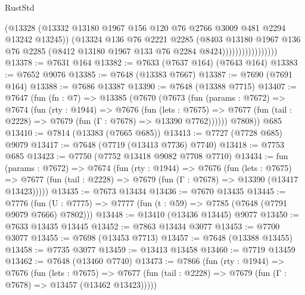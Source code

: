 \begin{lexlean}{RustStd}
\begin{coremodule}
{\begin{coremodule}
{{{{{{{{{{{{{{{{{{{{{{{{{{{{{{{{{{{{{{{{{{{{{{{{{{{{{                                (@13328
                                  (@13332
                                    @13180
                                    @1967
                                    @156
                                    @120
                                    @76
                                    @2766
                                    @3009
                                    @481
                                    @2294
                                    @13242
                                    @13245))
                                (@13324
                                  @136
                                  @76
                                  @2221
                                  @2285
                                  (@8403
                                    @13180
                                    @1967
                                    @136
                                    @76
                                    @2285
                                    (@8412 @13180 @1967 @133 @76 @2284 @8424)))))))))))))))))
@13378 := @7631 @164
@13382 := @7633 (@7637 @164) (@7643 @164)
@13383 := @7652 @9076
@13385 := @7648 (@13383 @7667)
@13387 := @7690 (@7691 @164)
@13388 := @7686 @13387
@13390 := @7648 (@13388 @7715)
@13407 := @7647
    (fun (fn : @7) =>
    @13385
      (@7670
        (@7673
          (fun (params : @7672) =>
          @7674
            (fun (rty : @1944) =>
            @7676
              (fun (lets : @7675) =>
              @7677 (fun (tail : @2228) => @7679 (fun (Γ : @7678) => @13390 @7762))))))
        @7808))
    @685
@13410 := @7814 (@13383 (@7665 @685))
@13413 := @7727 (@7728 @685) @9079
@13417 := @7648 (@7719 (@13413 @7736) @7740)
@13418 := @7753 @685
@13423 := @7750 (@7752 @13418 @9082 @7708 @7710)
@13434 := fun (params : @7672) =>
  @7674
    (fun (rty : @1944) =>
    @7676
      (fun (lets : @7675) =>
      @7677 (fun (tail : @2228) => @7679 (fun (Γ : @7678) => @13390 (@13417 @13423)))))
@13435 := @7673 @13434
@13436 := @7670 @13435
@13445 := @7776
    (fun (U : @7775) => @7777 (fun (t : @59) => @7785 (@7648 (@7791 @9079 @7666) @7802)))
@13448 := @13410 (@13436 @13445) @9077
@13450 := @7633 @13435 @13445
@13452 := @7863 @13434 @3077
@13453 := @7700 @3077
@13455 := @7698 (@13453 @7713)
@13457 := @7648 (@13388 @13455)
@13458 := @7735 @3077
@13459 := @13413 @13458
@13460 := @7719 @13459
@13462 := @7648 (@13460 @7740)
@13473 := @7866
    (fun (rty : @1944) =>
    @7676
      (fun (lets : @7675) =>
      @7677 (fun (tail : @2228) => @7679 (fun (Γ : @7678) => @13457 (@13462 @13423)))))
}}}}}}}}}}}}}}}}}}}}}}}}}}}}}}}}}}}}}}}}}}}}}}}}}}}}}
\end{coremodule}}
\end{coremodule}
\end{lexlean}
